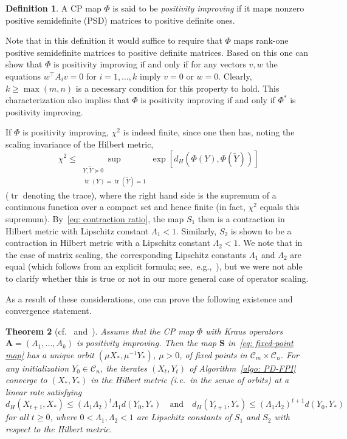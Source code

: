 \documentclass[a4paper]{article}
\newcommand{\bA}{\mathbf{A}}
\newcommand{\bS}{\mathbf{S}}
\newcommand{\caC}{\mathcal{C}}
\DeclareMathOperator{\tr}{tr}
\newtheorem{theorem}{Theorem}[section]
\theoremstyle{definition}
\newtheorem{definition}[theorem]{Definition}
\numberwithin{equation}{section}
\begin{document}
\begin{definition}\label{def:positivity improving}
A CP map $\Phi$ is said to be \emph{positivity improving} if it maps nonzero positive semidefinite (PSD) matrices to positive definite ones.
\end{definition}

Note that in this definition it would suffice to require that $\Phi$ maps rank-one positive semidefinite matrices to positive definite matrices. Based on this one can show that $\Phi$ is positivity improving if and only if for any vectors $v, w$ the equations $w^\top A_i v = 0$ for $i=1,\dots,k$ imply $v = 0$ or $w = 0$. Clearly, $k \ge \max(m,n)$ is a necessary condition for this property to hold. This characterization also implies that $\Phi$ is positivity improving if and only if $\Phi^*$ is positivity improving. 

If $\Phi$ is positivity improving, $\chi^2$ is indeed finite, since one then has, noting the scaling invariance of the Hilbert metric,
\[
 \chi^2 \le \sup_{\substack{Y, \tilde Y \succeq 0 \\ \tr(Y) = \tr(\tilde Y) = 1 }} \exp [d_H(\Phi(Y), \Phi(\tilde Y))]
\]
($\tr$ denoting the trace), where the right hand side is the supremum of a continuous function over a compact set and hence finite (in fact, $\chi^2$ equals this supremum). By~\eqref{eq: contraction ratio}, the map $S_1$ then is a contraction in Hilbert metric with Lipschitz constant $\Lambda_1 < 1$. Similarly, $S_2$ is shown to be a contraction in Hilbert metric with a Lipschitz constant $\Lambda_2 < 1$. We note that in the case of matrix scaling, the corresponding Lipschitz constants $\Lambda_1$ and $\Lambda_2$ are equal (which follows from an explicit formula; see,~e.g.,~\cite[Theorem~A.6.2]{Lemmens2012}), but we were not able to clarify whether this is true or not in our more general case of operator scaling.

As a result of these considerations, one can prove the following existence and convergence statement.

\begin{theorem}[{cf.~\cite[Theorem~6]{Georgiou2015} and~\cite[Corollary~9.16]{Idel2016}}]\label{thm: global convergence fpi}
Assume that the CP map $\Phi$ with Kraus operators $\bA = (A_1,\dots,A_k)$ is positivity improving. Then the map $\bS$ in~\eqref{eq: fixed-point map} has a unique orbit $(\mu X_*,\mu^{-1} Y_*)$, $\mu > 0$, of fixed points in $\caC_m \times \caC_n$. For any initialization $Y_0 \in \caC_n$, the iterates $(X_t,Y_t)$ of Algorithm~\ref{algo: PD-FPI} converge to $(X_*,Y_*)$ in the Hilbert metric (i.e.~in the sense of orbits) at a linear rate satisfying
\[
 d_H(X_{t+1},X_*) \le (\Lambda_1 \Lambda_2)^t \Lambda_1 d(Y_0,Y_*) \quad \text{and} \quad d_H(Y_{t+1},Y_*) \le  (\Lambda_1 \Lambda_2)^{t+1} d(Y_0,Y_*)
\]
for all $t \ge 0$, where $0 < \Lambda_1, \Lambda_2 < 1$ are Lipschitz constants of $S_1$ and $S_2$ with respect to the Hilbert metric.
\end{theorem}
\end{document}
